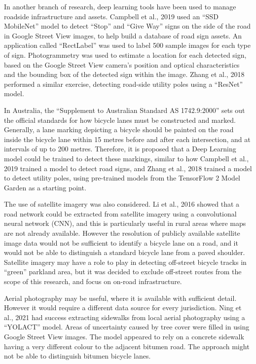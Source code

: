 \documentclass[11pt,twoside]{report}
\begin{document}
In another branch of research, deep learning tools have been used to manage roadside infrastructure and assets.  Campbell et al., 2019 \cite{CAMPBELL2019101350} used an ``SSD MobileNet'' model to detect ``Stop'' and ``Give Way'' signs on the side of the road in Google Street View images, to help build a database of road sign assets.  An application called ``RectLabel'' was used to label 500 sample images for each type of sign.  Photogrammetry was used to estimate a location for each detected sign, based on the Google Street View camera's position and optical characteristics and the bounding box of the detected sign within the image.  Zhang et al., 2018 \cite{s18082484} performed a similar exercise, detecting road-side utility poles using a ``ResNet'' model.

In Australia, the ``Supplement to Australian Standard AS 1742.9:2000'' sets out the official standards for how bicycle lanes must be constructed and marked.  Generally, a lane marking depicting a bicycle should be painted on the road inside the bicycle lane within 15 metres before and after each intersection, and at intervals of up to 200 metres\cite{standards}.  Therefore, it is proposed that a Deep Learning model could be trained to detect these markings, similar to how Campbell et al., 2019 \cite{CAMPBELL2019101350} trained a model to detect road signs, and Zhang et al., 2018 \cite{s18082484} trained a model to detect utility poles, using pre-trained models from the TensorFlow 2 Model Garden \cite{zoo} as a starting point.

The use of satellite imagery was also considered.  Li et al., 2016 \cite{ROADNETWORK} showed that a road network could be extracted from satellite imagery using a convolutional neural network (CNN), and this is particularly useful in rural areas where maps are not already available.  However the resolution of publicly available satellite image data would not be sufficient to identify a bicycle lane on a road, and it would not be able to distinguish a standard bicycle lane from a paved shoulder.  Satellite imagery may have a role to play in detecting off-street bicycle tracks in ``green'' parkland area, but it was decided to exclude off-street routes from the scope of this research, and focus on on-road infrastructure.

Aerial photography may be useful, where it is available with sufficient detail.  However it would require a different data source for every jurisdiction.  Ning et al., 2021 \cite{NING2021} had success extracting sidewalks from local aerial photography using a ``YOLACT'' model.  Areas of uncertainty caused by tree cover were filled in using Google Street View images.  The model appeared to rely on a concrete sidewalk having a very different colour to the adjacent bitumen road.  The approach might not be able to distinguish bitumen bicycle lanes.
\end{document}
